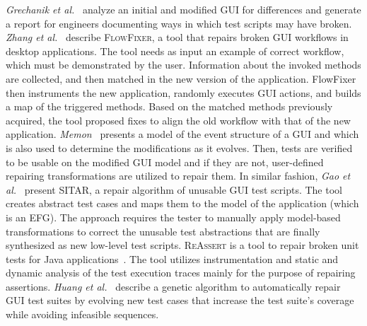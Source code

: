 \textit{Grechanik et al.}~\cite{Grechanik:2009:MEG:1555001.1555055} analyze an initial and modified GUI for differences and generate a report for engineers documenting ways in which test scripts may have broken.
\textit{Zhang et al.}~\cite{Zhang:2013:ARB:2483760.2483775} describe \textsc{FlowFixer}, a tool that repairs broken GUI workflows in desktop applications. The tool needs as input an example of correct workflow, which must be demonstrated by the user. Information about the invoked methods are collected, and then matched in the new version of the application. FlowFixer then instruments the new application, randomly executes GUI actions, and builds a map of the triggered methods. Based on the matched methods previously acquired, the tool proposed fixes to align the old workflow with that of the new application.
\textit{Memon}~\cite{Memon:2008:ARE:1416563.1416564} presents a model of the event structure of a GUI and which is also used to determine the modifications as it evolves. Then, tests are verified to be usable on the modified GUI model and if they are not, user-defined repairing transformations are utilized to repair them. In similar fashion, \textit{Gao et al.}~\cite{Gao:2016:SGT:3046547.3046580} present \textsc{SITAR}, a repair algorithm of unusable GUI test scripts. The tool creates abstract test cases and maps them to the model of the application (which is an EFG). The approach requires the tester to manually apply model-based transformations to correct the unusable test abstractions that are finally synthesized as new low-level test scripts. 
\textsc{ReAssert} is a tool to repair broken unit tests for Java applications~\cite{Daniel:2011:AGR:2002931.2002937,Daniel:2011:RTR:1985793.1985978,Daniel:2009:RSR:1747491.1747538,Daniel:2010:TRU:1831708.1831734}. The tool utilizes instrumentation and static and dynamic analysis of the test execution traces mainly for the purpose of repairing assertions. 
\textit{Huang et al.}~\cite{Huang:2010:RGT:1828417.1828465} describe a genetic algorithm to automatically repair GUI test suites by evolving new test cases that increase the test suite's coverage while avoiding infeasible sequences.

